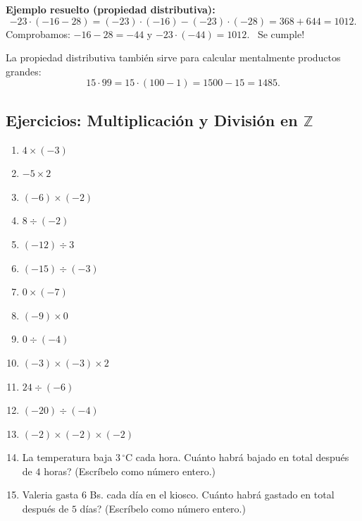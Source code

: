 \documentclass[12pt, letterpaper]{article}
\newcommand{\Z}{\mathbb{Z}}
\begin{document}
\noindent\textbf{Ejemplo resuelto (propiedad distributiva):}
\[
  -23 \cdot (-16 - 28) = (-23) \cdot (-16) - (-23) \cdot (-28) = 368 + 644 = 1012.
\]
Comprobamos: $-16 - 28 = -44$ y $-23 \cdot (-44) = 1012$. \ \textquestiondown Se cumple!

\noindent La propiedad distributiva también sirve para calcular mentalmente productos grandes:
\[
  15 \cdot 99 = 15 \cdot (100 - 1) = 1500 - 15 = 1485.
\]

\subsection{Ejercicios: Multiplicación y División en $\Z$}

\begin{enumerate}[leftmargin=*, start=55]
  \item \facil{} $4 \times (-3)$

  \item \facil{} $-5 \times 2$

  \item \facil{} $(-6) \times (-2)$

  \item \facil{} $8 \div (-2)$

  \item \facil{} $(-12) \div 3$

  \item \facil{} $(-15) \div (-3)$

  \item \medio{} $0 \times (-7)$

  \item \medio{} $(-9) \times 0$

  \item \medio{} $0 \div (-4)$

  \item \medio{} $(-3) \times (-3) \times 2$

  \item \medio{} $24 \div (-6)$

  \item \medio{} $(-20) \div (-4)$

  \item \medio{} $(-2) \times (-2) \times (-2)$

  \item \medio{} La temperatura baja $3\,^{\circ}$C cada hora. \textquestiondown Cuánto habrá bajado en total después de $4$ horas? (Escríbelo como número entero.)

  \item \medio{} Valeria gasta $6$ Bs. cada día en el kiosco. \textquestiondown Cuánto habrá gastado en total después de $5$ días? (Escríbelo como número entero.)


\end{enumerate}
\end{document}
